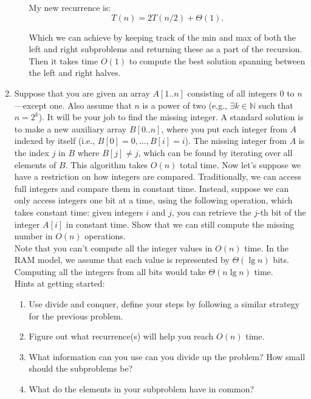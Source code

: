 \documentclass[letterpaper,11pt]{article}
\begin{document}
\begin{enumerate}
\begin{enumerate}
My new recurrence is:
\[T(n) = 2T(n/2) + \Theta(1).\]

Which we can achieve by keeping track of the min and max of both the left and right subproblems and returning these as a part of the recursion. Then it takes time $O(1)$ to compute the best solution spanning between the left and right halves.
\end{enumerate}

\newpage
\item Suppose that you are given an array $A[1..n]$ consisting of all integers $0$ to $n$---except one. Also assume that $n$ is a power of two (e.g., $\exists k\in\mathbb{N}$ such that $n = 2^k$). It will be your job to find the missing integer. A standard solution is to make a new auxiliary array $B[0..n]$, where you put each integer from $A$ indexed by itself (i.e., $B[0] = 0,\ldots, B[i] = i$). The missing integer from $A$ is the index $j$ in $B$ where $B[j]\neq j$, which can be found by iterating over all elements of $B$. This algorithm takes $O(n)$ total time. Now let's suppose we have a restriction on how integers are compared. Traditionally, we can access full integers and compare them in constant time. Instead, suppose we can only access integers one bit at a time, using the following operation, which takes constant time: given integers $i$ and $j$, you can retrieve the $j$-th bit of the integer $A[i]$ in constant time. Show that we can still compute the missing number in $O(n)$ operations. \\

Note that you can't compute all the integer values in $O(n)$ time. In the RAM model, we assume that each value is represented by $\Theta(\lg n)$ bits. Computing all the integers from all bits would take $\Theta(n\lg n)$ time. \\

Hints at getting started: 
\begin{enumerate}
\item Use divide and conquer, define your steps by following a similar strategy for the previous problem. 
\item Figure out what recurrence(s) will help you reach $O(n)$ time.
\item What information can you use can you divide up the problem? How small should the subproblems be?
\item What do the elements in your subproblem have in common?
\end{enumerate}



\end{enumerate}
\end{document}
